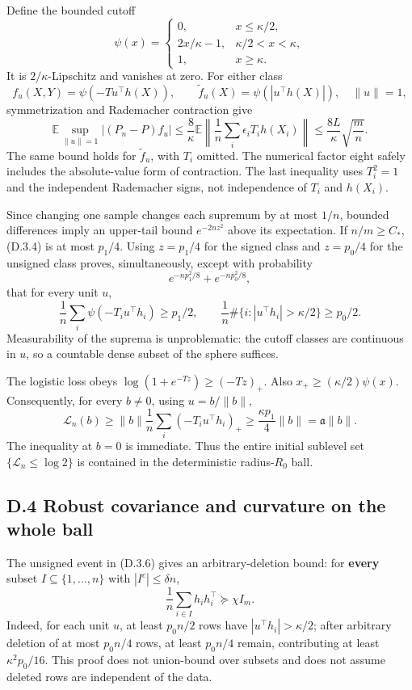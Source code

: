 \documentclass[
  11pt,
  a4paper,
]{article}
\begin{document}
Define the bounded cutoff \[
\psi(x)=
\begin{cases}
0,&x\leq\kappa/2,\\
2x/\kappa-1,&\kappa/2<x<\kappa,\\
1,&x\geq\kappa.
\end{cases}
\tag{D.3.3}
\] It is \(2/\kappa\)-Lipschitz and vanishes at zero. For either class
\[
f_u(X,Y)=\psi(-T u^\top h(X)),\qquad
\widetilde f_u(X)=\psi(|u^\top h(X)|),\quad \|u\|=1,
\] symmetrization and Rademacher contraction give \[
\mathbb E\sup_{\|u\|=1}|(P_n-P)f_u|
\leq\frac{8}{\kappa}
 \mathbb E\left\|\frac1n\sum_i\epsilon_iT_i h(X_i)\right\|
\leq\frac{8L}{\kappa}\sqrt{\frac mn}.
\tag{D.3.4}
\] The same bound holds for \(\widetilde f_u\), with \(T_i\) omitted.
The numerical factor eight safely includes the absolute-value form of
contraction. The last inequality uses \(T_i^2=1\) and the independent
Rademacher signs, not independence of \(T_i\) and \(h(X_i)\).

Since changing one sample changes each supremum by at most \(1/n\),
bounded differences imply an upper-tail bound \(e^{-2nz^2}\) above its
expectation. If \(n/m\geq C_*\), (D.3.4) is at most \(p_1/4\). Using
\(z=p_1/4\) for the signed class and \(z=p_0/4\) for the unsigned class
proves, simultaneously, except with probability \[
e^{-np_1^2/8}+e^{-np_0^2/8},
\tag{D.3.5}
\] that for every unit \(u\), \[
\frac1n\sum_i\psi(-T_i u^\top h_i)\geq p_1/2,
\qquad
\frac1n\#\{i:|u^\top h_i|>\kappa/2\}\geq p_0/2.
\tag{D.3.6}
\] Measurability of the suprema is unproblematic: the cutoff classes are
continuous in \(u\), so a countable dense subset of the sphere suffices.

The logistic loss obeys \(\log(1+e^{-Tz})\geq(-Tz)_+\). Also
\(x_+\geq(\kappa/2)\psi(x)\). Consequently, for every \(b\ne0\), using
\(u=b/\|b\|\), \[
\mathcal L_n(b)
\geq\|b\|\frac1n\sum_i(-T_i u^\top h_i)_+
\geq\frac{\kappa p_1}{4}\|b\|
=\mathfrak a\|b\|.
\tag{D.3.7}
\] The inequality at \(b=0\) is immediate. Thus the entire initial
sublevel set \(\{\mathcal L_n\leq\log2\}\) is contained in the
deterministic radius-\(R_0\) ball.

\hypertarget{d.4-robust-covariance-and-curvature-on-the-whole-ball}{%
\subsection{D.4 Robust covariance and curvature on the whole
ball}\label{d.4-robust-covariance-and-curvature-on-the-whole-ball}}

The unsigned event in (D.3.6) gives an arbitrary-deletion bound: for
\textbf{every} subset \(I\subseteq\{1,\ldots,n\}\) with
\(|I^c|\leq\delta n\), \[
\frac1n\sum_{i\in I}h_i h_i^\top\succeq\chi I_m.
\tag{D.4.1}
\] Indeed, for each unit \(u\), at least \(p_0n/2\) rows have
\(|u^\top h_i|>\kappa/2\); after arbitrary deletion of at most
\(p_0n/4\) rows, at least \(p_0n/4\) remain, contributing at least
\(\kappa^2p_0/16\). This proof does not union-bound over subsets and
does not assume deleted rows are independent of the data.
\end{document}
